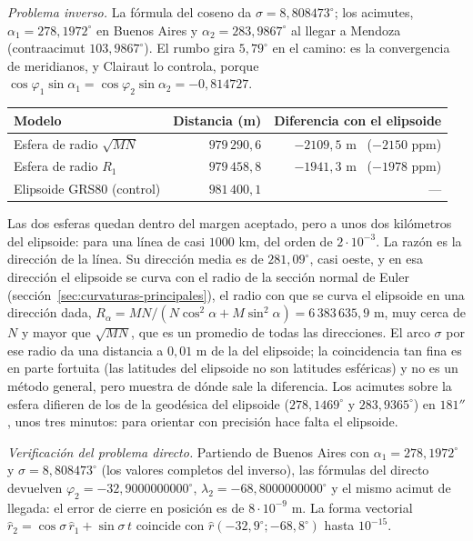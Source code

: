 \emph{Problema inverso.} La fórmula del coseno da \(\sigma=8{,}808473^\circ\); los acimutes,
\(\alpha_1=278{,}1972^\circ\) en Buenos Aires y \(\alpha_2=283{,}9867^\circ\) al llegar a
Mendoza (contraacimut \(103{,}9867^\circ\)). El rumbo gira \(5{,}79^\circ\) en el camino: es la
convergencia de meridianos, y Clairaut lo controla, porque
\(\cos\varphi_1\sin\alpha_1=\cos\varphi_2\sin\alpha_2=-0{,}814727\).

\begin{center}
\begin{tabular}{lrr}
\toprule
Modelo & Distancia (m) & Diferencia con el elipsoide \\
\midrule
Esfera de radio \(\sqrt{MN}\) & \(979\,290{,}6\) & \(-2109{,}5\) m \ (\(-2150\) ppm)\\
Esfera de radio \(R_1\) & \(979\,458{,}8\) & \(-1941{,}3\) m \ (\(-1978\) ppm)\\
Elipsoide GRS80 (control) & \(981\,400{,}1\) & --- \\
\bottomrule
\end{tabular}
\end{center}

Las dos esferas quedan dentro del margen aceptado, pero a unos dos kilómetros del
elipsoide: para una línea de casi \(1000\) km, del orden de \(2\cdot10^{-3}\). La razón es la
dirección de la línea. Su dirección media es de \(281{,}09^\circ\), casi oeste, y en esa dirección
el elipsoide se curva con el radio de la sección normal de Euler
(sección~\ref{sec:curvaturas-principales}), el radio con que se curva el elipsoide en una
dirección dada,
\(R_\alpha=MN/(N\cos^2\alpha+M\sin^2\alpha)=6\,383\,635{,}9\) m, muy cerca de \(N\) y mayor
que \(\sqrt{MN}\), que es un promedio de todas las direcciones. El arco \(\sigma\) por ese
radio da una distancia a \(0{,}01\) m de la del elipsoide; la coincidencia tan fina es en parte
fortuita (las latitudes del elipsoide no son latitudes esféricas) y no es un método general,
pero muestra de dónde sale la diferencia. Los acimutes sobre la esfera difieren de los de la
geodésica del elipsoide (\(278{,}1469^\circ\) y \(283{,}9365^\circ\)) en \(181''\), unos tres
minutos: para orientar con precisión hace falta el elipsoide.

\emph{Verificación del problema directo.} Partiendo de Buenos Aires con
\(\alpha_1=278{,}1972^\circ\) y \(\sigma=8{,}808473^\circ\) (los valores completos del
inverso), las fórmulas del directo devuelven \(\varphi_2=-32{,}9000000000^\circ\),
\(\lambda_2=-68{,}8000000000^\circ\) y el mismo acimut de llegada: el error de cierre en
posición es de \(8\cdot10^{-9}\) m. La forma vectorial
\(\hat r_2=\cos\sigma\,\hat r_1+\sin\sigma\,t\) coincide con \(\hat r(-32{,}9^\circ;-68{,}8^\circ)\)
hasta \(10^{-15}\).

